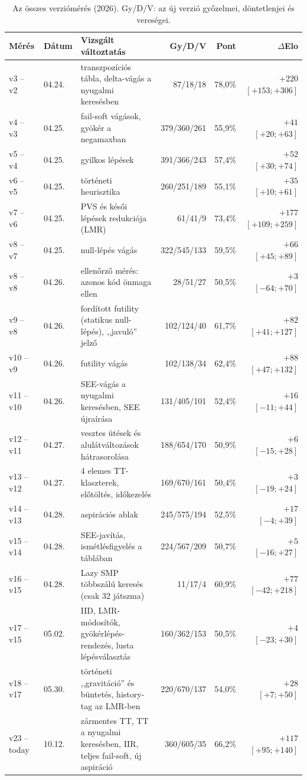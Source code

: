 \begin{table}[!ht]
	\scriptsize
	\centering
	\begin{tabularx}{\linewidth}{l l X r r r}
		\toprule
		Mérés & Dátum & Vizsgált változtatás & Gy/D/V & Pont & $\Delta$Elo \\
		\midrule
		v3 -- v2 & 04.24. & transzpozíciós tábla, delta-vágás a nyugalmi keresésben & 87/18/18 & 78,0\% & $+220$ $[+153;+306]$ \\
		v4 -- v3 & 04.25. & fail-soft vágások, gyökér a negamaxban & 379/360/261 & 55,9\% & $+41$ $[+20;+63]$ \\
		v5 -- v4 & 04.25. & gyilkos lépések & 391/366/243 & 57,4\% & $+52$ $[+30;+74]$ \\
		v6 -- v5 & 04.25. & történeti heurisztika & 260/251/189 & 55,1\% & $+35$ $[+10;+61]$ \\
		v7 -- v6 & 04.25. & PVS és késői lépések redukciója (LMR) & 61/41/9 & 73,4\% & $+177$ $[+109;+259]$ \\
		v8 -- v7 & 04.25. & null-lépés vágás & 322/545/133 & 59,5\% & $+66$ $[+45;+89]$ \\
		v8 -- v8 & 04.26. & ellenőrző mérés: azonos kód önmaga ellen & 28/51/27 & 50,5\% & $+3$ $[-64;+70]$ \\
		v9 -- v8 & 04.26. & fordított futility (statikus null-lépés), ,,javuló'' jelző & 102/124/40 & 61,7\% & $+82$ $[+41;+127]$ \\
		v10 -- v9 & 04.26. & futility vágás & 102/138/34 & 62,4\% & $+88$ $[+47;+132]$ \\
		v11 -- v10 & 04.26. & SEE-vágás a nyugalmi keresésben, SEE újraírása & 131/405/101 & 52,4\% & $+16$ $[-11;+44]$ \\
		v12 -- v11 & 04.27. & vesztes ütések és alulátváltozások hátrasorolása & 188/654/170 & 50,9\% & $+6$ $[-15;+28]$ \\
		v13 -- v12 & 04.27. & 4 elemes TT-klaszterek, előtöltés, időkezelés & 169/670/161 & 50,4\% & $+3$ $[-19;+24]$ \\
		v14 -- v13 & 04.28. & aspirációs ablak & 245/575/194 & 52,5\% & $+17$ $[-4;+39]$ \\
		v15 -- v14 & 04.28. & SEE-javítás, ismétlésfigyelés a táblában & 224/567/209 & 50,7\% & $+5$ $[-16;+27]$ \\
		v16 -- v15 & 04.28. & Lazy SMP többszálú keresés (csak 32 játszma) & 11/17/4 & 60,9\% & $+77$ $[-42;+218]$ \\
		v17 -- v15 & 05.02. & IID, LMR-módosítók, gyökérlépés-rendezés, lusta lépésválasztás & 160/362/153 & 50,5\% & $+4$ $[-23;+30]$ \\
		v18 -- v17 & 05.30. & történeti ,,gravitáció'' és büntetés, history-tag az LMR-ben & 220/670/137 & 54,0\% & $+28$ $[+7;+50]$ \\
		v23 -- today & 10.12. & zármentes TT, TT a nyugalmi keresésben, IIR, teljes fail-soft, új aspiráció & 360/605/35 & 66,2\% & $+117$ $[+95;+140]$ \\
		\bottomrule
	\end{tabularx}
	\caption{Az összes verziómérés (2026). Gy/D/V: az új verzió győzelmei, döntetlenjei és vereségei.}
	\label{tab:versions}
\end{table}

